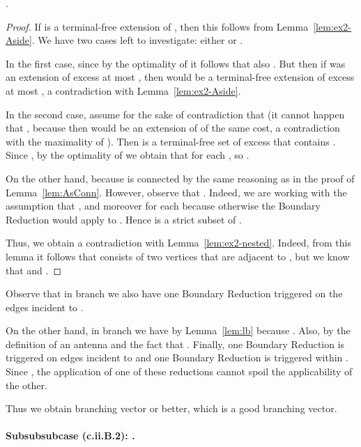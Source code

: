 \begin{myclaim}\label{cl:even-if-terminal2}
.
\end{myclaim}
\begin{proof}
If  is a terminal-free extension of , then this follows from Lemma~\ref{lem:ex2-Aside}. We have two cases left to investigate: either  or .

In the first case, since  by the optimality of  it follows that also . But then if  was an extension of excess at most , then  would be a terminal-free extension of excess at most , a contradiction with Lemma~\ref{lem:ex2-Aside}.

In the second case, assume for the sake of contradiction that  (it cannot happen that , because then  would be an extension of  of the same cost, a contradiction with the maximality of ). Then  is a terminal-free set of excess  that contains . Since , by the optimality of  we obtain that  for each , so . 

On the other hand,  because  is connected by the same reasoning as in the proof of Lemma~\ref{lem:AsConn}. However, observe that . Indeed, we are working with the assumption that , and moreover  for each  because otherwise the Boundary Reduction would apply to . Hence  is a strict subset of . 

Thus, we obtain a contradiction with Lemma~\ref{lem:ex2-nested}. Indeed, from this lemma it follows that  consists of two vertices that are adjacent to , but we know that  and .
\end{proof}

Observe that in branch  we also have one Boundary Reduction triggered on the edges incident to .

On the other hand, in branch  we have  by Lemma~\ref{lem:lb} because . Also,  by the definition of an antenna and the fact that . Finally, one Boundary Reduction is triggered on edges incident to  and one Boundary Reduction is triggered within . Since , the application of one of these reductions cannot spoil the applicability of the other.

Thus we obtain branching vector  or better, which is a good branching vector.









\paragraph*{Subsubsubcase (c.ii.B.2): .}

